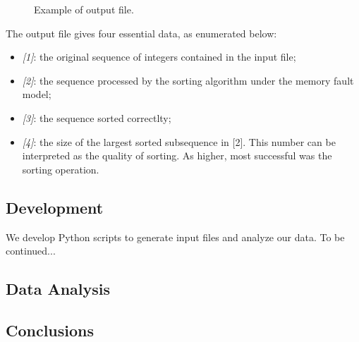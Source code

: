 \begin{figure}[H]
    \centering
    \fbox{
    \theverbbox
    }
    \caption{Example of output file.}
    \label{output-file-example}
\end{figure}

The output file gives four essential data, as enumerated below:
\begin{itemize}
    \item \textit{[1]}: the original sequence of integers contained in the input file;
    \item \textit{[2]}: the sequence processed by the sorting algorithm under the memory fault model;
    \item \textit{[3]}: the sequence sorted correctlty;
    \item \textit{[4]}: the size of the largest sorted subsequence in [2]. This number can be interpreted as the quality of sorting. As higher, most successful was the sorting operation.
\end{itemize}

\subsection{Development}

We develop Python scripts to generate input files and analyze our data. To be continued...

\subsection{Data Analysis}

\subsection{Conclusions}

